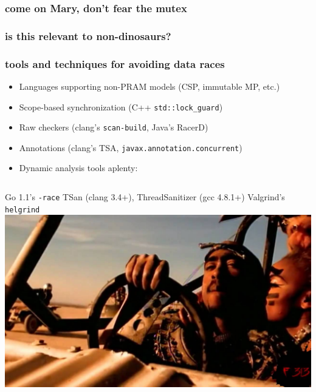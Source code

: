 \documentclass{beamer}
\begin{document}
\begin{frame}
\frametitle{come on Mary, don't fear the mutex}
\end{frame}

\begin{frame}
\frametitle{is this relevant to non-dinosaurs?}
\end{frame}

\begin{frame}
\frametitle{tools and techniques for avoiding data races}
\begin{itemize}
\item Languages supporting non-PRAM models (CSP, immutable MP, etc.)
\item Scope-based synchronization (C++ \texttt{std::lock\_guard})
\item Raw checkers (clang's {\texttt{scan-build}}, Java's RacerD)
\item Annotations (clang's TSA, {\texttt{javax.annotation.concurrent}})
\item Dynamic analysis tools aplenty:
\end{itemize}
\vfill
\begin{columns}
Go 1.1's \texttt{-race}
\vfill
TSan (clang 3.4+), ThreadSanitizer (gcc 4.8.1+)
\vfill
Valgrind's \texttt{helgrind}
\includegraphics[width=1\textwidth]{maxresdefault.jpg}
\end{columns}
\end{frame}
\end{document}
